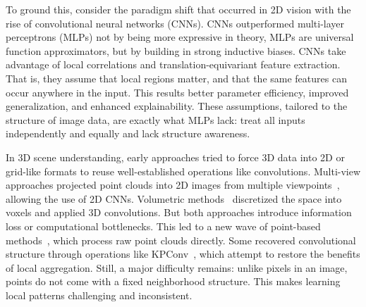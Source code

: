 To ground this, consider the paradigm shift that occurred in 2D vision with the
rise of convolutional neural networks (CNNs). CNNs outperformed multi-layer
perceptrons (MLPs) not by being more expressive in theory, MLPs are universal
function approximators, but by building in strong inductive biases.
%
CNNs take advantage of local correlations and translation-equivariant feature
extraction. That is, they assume that local regions matter, and that the same
features can occur anywhere in the input. This results better parameter
efficiency, improved generalization, and enhanced explainability.
%
These assumptions, tailored to the structure of image data, are exactly what
MLPs lack: treat all inputs independently and equally and lack structure
awareness.
%

In 3D scene understanding, early approaches tried to force 3D data into 2D or
grid-like formats to reuse well-established operations like convolutions.
%
Multi-view approaches projected point clouds into 2D images from multiple
viewpoints~\cite{su2015multi,lawin2017deep,feng2018gvcnn}, allowing the use of
2D CNNs.
%
Volumetric
methods~\cite{maturana2015voxnet,zhang2020polarnet,chen2023voxelnext}
discretized the space into voxels and applied 3D convolutions. But both
approaches introduce information loss or computational bottlenecks.
%
This led to a new wave of point-based
methods~\cite{qi2017pointnet,qi2017pointnet++,li2018pointcnn,thomas2019kpconv,hu2020randla,kong2023rethinking,qian2022pointnext},
which process raw point clouds directly. Some recovered convolutional structure
through operations like KPConv~\cite{thomas2019kpconv}, which attempt to
restore the benefits of local aggregation.
%
Still, a major difficulty remains: unlike pixels in an image, points do not
come with a fixed neighborhood structure. This makes learning local patterns
challenging and inconsistent.


